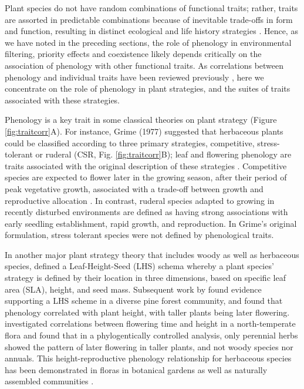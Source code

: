 \documentclass[11pt]{article}
\begin{document}
Plant species do not have random combinations of functional traits; rather, traits are assorted in predictable combinations because of inevitable trade-offs in form and function, resulting in distinct ecological and life history strategies \citep{stearns1998evolution,adler2014functional,westoby2002plant}. Hence, as we have noted in the preceding sections, the role of phenology in environmental filtering, priority effects and coexistence likely depends critically on the association of phenology with other functional traits. As correlations between phenology and individual traits have been reviewed previously \citep[e.g.][]{wolkovich2014aob,segrestin2020reproductive}, here we concentrate on the role of phenology in plant strategies, and the suites of traits associated with these strategies.

Phenology is a key trait in some classical theories on plant strategy (Figure \ref{fig:traitcorr}A). For instance, Grime (1977) suggested that herbaceous plants could be classified according to three primary strategies, competitive, stress-tolerant or ruderal (CSR, Fig. \ref{fig:traitcorr}B); leaf and flowering phenology are traits associated with the original description of these strategies \citep[see Table 2 in][]{grime1977evidence}. Competitive species are expected to flower later in the growing season, after their period of peak vegetative growth, associated with a trade-off between growth and reproductive allocation \citep{law1979cost}. In contrast, ruderal species adapted to growing in recently disturbed environments are defined as having strong associations with early seedling establishment, rapid growth, and reproduction. In Grime’s original formulation, stress tolerant species were not defined by phenological traits.

In another major plant strategy theory that includes woody as well as herbaceous species, \citet{westoby1998leaf} defined a Leaf-Height-Seed (LHS) schema whereby a plant species’ strategy is defined by their location in three dimensions, based on specific leaf area (SLA), height, and seed mass. Subsequent work by \citet{laughlin2010multi} found evidence supporting a LHS scheme in a diverse pine forest community, and found that phenology correlated with plant height, with taller plants being later flowering. \citet{bolmgren2008time} investigated correlations between flowering time and height in a north-temperate flora and found that in a phylogentically controlled analysis, only perennial herbs showed the pattern of later flowering in taller plants, and not woody species nor annuals. This height-reproductive phenology relationship for herbaceous species has been demonstrated in floras in botanical gardens \citep{sporbert2022functional, horbach2023flowering} as well as naturally assembled communities \citep{du2010trade, liu2021linkage}.
\end{document}
